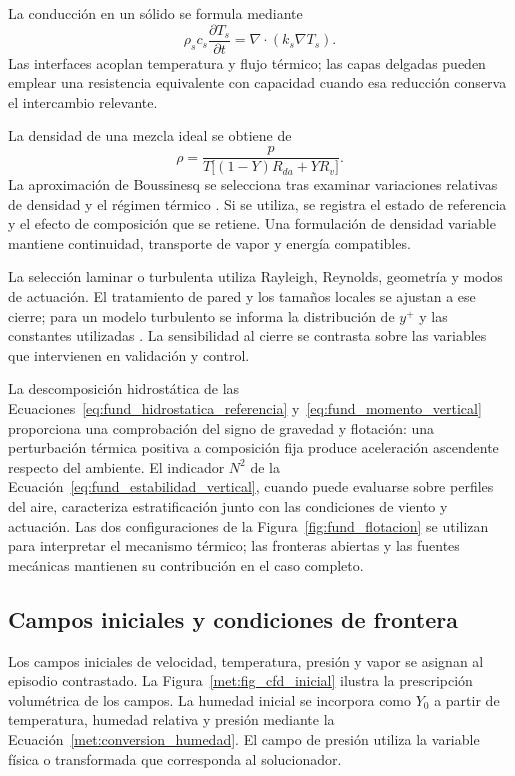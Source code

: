 La conducción en un sólido se formula mediante
\begin{equation}
\rho_sc_s\frac{\partial T_s}{\partial t}=\nabla\cdot(k_s\nabla T_s).
\label{met:cfd_solido}
\end{equation}
Las interfaces acoplan temperatura y flujo térmico; las capas delgadas pueden emplear una resistencia equivalente con capacidad cuando esa reducción conserva el intercambio relevante.

La densidad de una mezcla ideal se obtiene de
\begin{equation}
\rho=\frac{p}{T\bigl[(1-Y)R_{da}+YR_v\bigr]}.
\label{met:cfd_densidad}
\end{equation}
La aproximación de Boussinesq se selecciona tras examinar variaciones relativas de densidad y el régimen térmico \cite{gray1976}. Si se utiliza, se registra el estado de referencia y el efecto de composición que se retiene. Una formulación de densidad variable mantiene continuidad, transporte de vapor y energía compatibles.

La selección laminar o turbulenta utiliza Rayleigh, Reynolds, geometría y modos de actuación. El tratamiento de pared y los tamaños locales se ajustan a ese cierre; para un modelo turbulento se informa la distribución de $y^+$ y las constantes utilizadas \cite{launder1974,versteeg2007}. La sensibilidad al cierre se contrasta sobre las variables que intervienen en validación y control.

La descomposición hidrostática de las Ecuaciones~\eqref{eq:fund_hidrostatica_referencia} y~\eqref{eq:fund_momento_vertical} proporciona una comprobación del signo de gravedad y flotación: una perturbación térmica positiva a composición fija produce aceleración ascendente respecto del ambiente. El indicador $N^2$ de la Ecuación~\eqref{eq:fund_estabilidad_vertical}, cuando puede evaluarse sobre perfiles del aire, caracteriza estratificación junto con las condiciones de viento y actuación. Las dos configuraciones de la Figura~\ref{fig:fund_flotacion} se utilizan para interpretar el mecanismo térmico; las fronteras abiertas y las fuentes mecánicas mantienen su contribución en el caso completo.

\subsection{Campos iniciales y condiciones de frontera}

Los campos iniciales de velocidad, temperatura, presión y vapor se asignan al episodio contrastado. La Figura~\ref{met:fig_cfd_inicial} ilustra la prescripción volumétrica de los campos. La humedad inicial se incorpora como $Y_0$ a partir de temperatura, humedad relativa y presión mediante la Ecuación~\ref{met:conversion_humedad}. El campo de presión utiliza la variable física o transformada que corresponda al solucionador.

